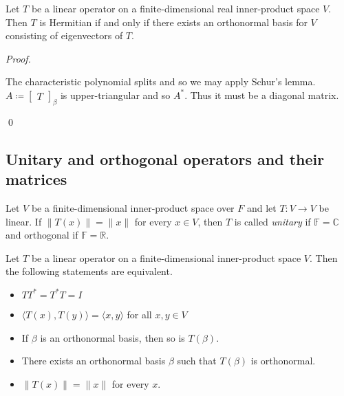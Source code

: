 \documentclass[12pt]{article}
\newenvironment{theorem}[2][Theorem]{\begin{trivlist}
\item[\hskip \labelsep {\bfseries #1}\hskip \labelsep {\bfseries #2.}]}{\end{trivlist}}
\newenvironment{definition}[2][Definition]{\begin{trivlist}
\item[\hskip \labelsep {\bfseries #1}\hskip \labelsep {\bfseries #2}]}{\end{trivlist}}
\newenvironment{sol}
    {\emph{Proof.}
    }
    {
    \qed
    }
\begin{document}
\begin{theorem}{6.17}
Let $T$ be a linear operator on a finite-dimensional real inner-product space $V$. Then $T$ is Hermitian if and only if there exists an orthonormal basis for $V$ consisting of eigenvectors of $T$.
\end{theorem}

\begin{sol}
The characteristic polynomial splits and so we may apply Schur's lemma. $A \coloneqq \begin{bmatrix} T \end{bmatrix}_\beta$ is upper-triangular and so $A^*$. Thus it must be a diagonal matrix.
\end{sol}

\subsection{Unitary and orthogonal operators and their matrices}

\begin{definition}{9}
Let $V$ be a finite-dimensional inner-product space over $F$ and let $T : V \to V$ be linear. If $\lVert T(x) \rVert = \lVert x \rVert$ for every $x \in V$, then $T$ is called \textit{unitary} if $\mathbb{F} = \mathbb{C}$ and orthogonal if $\mathbb{F} = \mathbb{R}$. 
\end{definition}

\begin{theorem}{6.18}
Let $T$ be a linear operator on a finite-dimensional inner-product space $V$. Then the following statements are equivalent.

\begin{itemize}
    \item[(a)] $TT^* = T^*T = I$
    
    \item[(b)] $\langle T(x), T(y) \rangle = \langle x, y \rangle$ for all $x, y \in V$
    
    \item[(c)] If $\beta$ is an orthonormal basis, then so is $T(\beta)$.
    
    \item[(d)] There exists an orthonormal basis $\beta$ such that $T(\beta)$ is orthonormal.
    
    \item[(e)] $\lVert T(x) \lVert = \lVert x \rVert$ for every $x$.
\end{itemize}
\end{theorem}
\end{document}
